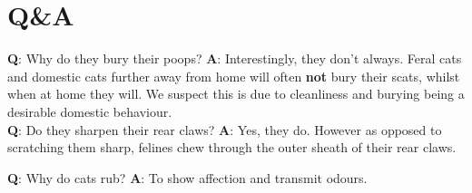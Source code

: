 \documentclass{article}
\begin{document}
\section*{Q\&A}
\begin{multicols}{3}
\begin{minipage}{8cm}
    \textbf{Q}: Why do they bury their poops?
    \textbf{A}: Interestingly, they don't always. Feral cats and domestic cats further away from home will often \textbf{not} bury their scats, whilst when at home they will. We suspect this is due to cleanliness and burying being a desirable domestic behaviour.\\
    \textbf{Q}: Do they sharpen their rear claws?
    \textbf{A}: Yes, they do. However as opposed to scratching them sharp, felines chew through the outer sheath of their rear claws.

    \vspace{0.5cm}
    \hrulefill

\end{minipage}

\hspace{2.5cm}
    \begin{minipage}{0.5cm}
        \begin{turn}{90}
            \textbf{Q}: Why do cats rub?
            \textbf{A}: To show affection and transmit odours.
        \end{turn}
    \end{minipage}


\end{multicols}
\end{document}
